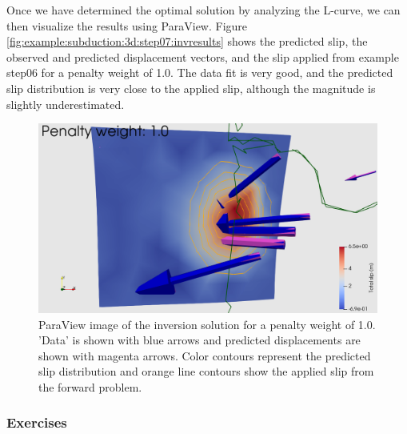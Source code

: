 Once we have determined the optimal solution by analyzing the L-curve,
we can then visualize the results using ParaView. Figure
\vref{fig:example:subduction:3d:step07:invresults} shows the predicted
slip, the observed and predicted displacement vectors, and the slip
applied from example step06 for a penalty weight of 1.0. The data fit
is very good, and the predicted slip distribution is very close to the
applied slip, although the magnitude is slightly underestimated.
\begin{figure}
  \includegraphics[width=4.5in]{examples/figs/subduction3d_step07_inverse_soln}
  \caption{ParaView image of the inversion solution for a penalty
    weight of 1.0. 'Data' is shown with blue arrows and predicted
    displacements are shown with magenta arrows. Color contours
    represent the predicted slip distribution and orange line contours
    show the applied slip from the forward problem.}
  \label{fig:example:subduction:3d:step07:invresults}
\end{figure}

\subsubsection{Exercises}

